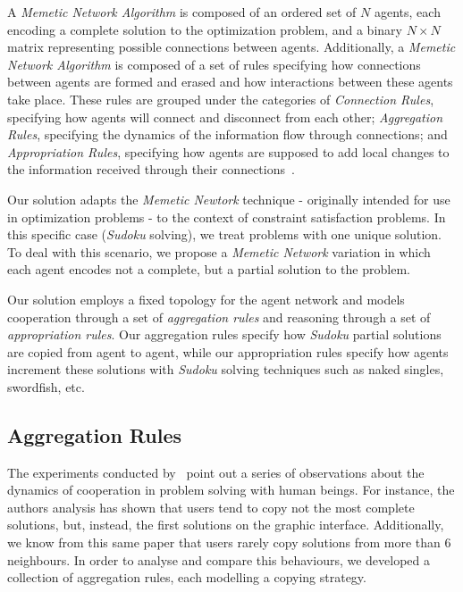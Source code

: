 \documentclass{article}
\begin{document}
A {\em Memetic Network Algorithm} is composed of an ordered set of $N$ agents, each encoding a complete solution to the optimization problem, and a binary $N \times N$ matrix representing possible connections between agents. Additionally, a {\em Memetic Network Algorithm} is composed of a set of rules specifying how connections between agents are formed and erased and how interactions between these agents take place. These rules are grouped under the categories of {\em Connection Rules}, specifying how agents will connect and disconnect from each other; {\em Aggregation Rules}, specifying the dynamics of the information flow through connections; and {\em Appropriation Rules}, specifying how agents are supposed to add local changes to the information received through their connections~\cite{lamb:memenet}.

Our solution adapts the {\em Memetic Newtork} technique - originally intended for use in optimization problems - to the context of constraint satisfaction problems. In this specific case ({\em Sudoku} solving), we treat problems with one unique solution. To deal with this scenario, we propose a {\em Memetic Network} variation in which each agent encodes not a complete, but a partial solution to the problem.

Our solution employs a fixed topology for the agent network and models cooperation through a set of {\em aggregation rules} and reasoning through a set of {\em appropriation rules}. Our aggregation rules specify how {\em Sudoku} partial solutions are copied from agent to agent, while our appropriation rules specify how agents increment these solutions with {\em Sudoku} solving techniques such as naked singles, swordfish, etc.

\subsection{Aggregation Rules}

The experiments conducted by~\cite{farenzena:collabem} point out a series of observations about the dynamics of cooperation in problem solving with human beings. For instance, the authors analysis has shown that users tend to copy not the most complete solutions, but, instead, the first solutions on the graphic interface. Additionally, we know from this same paper that users rarely copy solutions from more than 6 neighbours. In order to analyse and compare this behaviours, we developed a collection of aggregation rules, each modelling a copying strategy.
\end{document}
